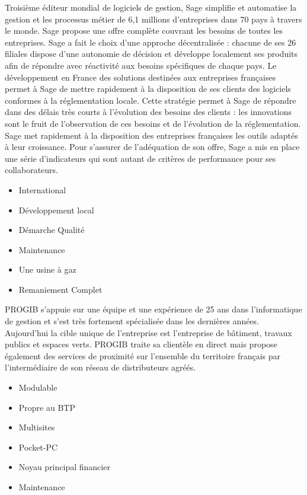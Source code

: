{
	Troisième éditeur mondial de logiciels de gestion, Sage simplifie et automatise la gestion et les processus métier de 6,1 millions d'entreprises dans 70 pays à travers le monde.
	Sage propose une offre complète couvrant les besoins de toutes les entreprises.
	Sage a fait le choix d'une approche décentralisée : chacune de ses 26 filiales dispose d'une autonomie
	de décision et développe localement ses produits afin de répondre avec réactivité aux besoins spécifiques de chaque pays.
	Le développement en France des solutions destinées aux entreprises françaises permet  à  Sage de mettre rapidement à la disposition de ses clients des logiciels conformes à la réglementation locale.
	Cette stratégie permet à Sage de répondre dans des délais très courts  à  l'évolution des besoins des clients : les innovations sont le fruit de l'observation de ces besoins et de l'évolution de la réglementation.
	Sage met rapidement à la disposition des entreprises françaises les outils adaptés à leur croissance.
	Pour s'assurer de l'adéquation de son offre, Sage a mis en place une série d'indicateurs qui sont autant de critères de performance pour ses collaborateurs.
}
{
    \begin{itemize}
        \item International
        \item Développement local
        \item Démarche Qualité
        \item Maintenance
    \end{itemize}
}
{
    \begin{itemize}
        \item Une usine à gaz%
        \item Remaniement Complet
    \end{itemize}
}
 
{
    PROGIB s'appuie sur une équipe et une expérience de 25 ans dans l'informatique de gestion et s'est très fortement spécialisée dans les dernières années.
    Aujourd'hui la cible unique de l'entreprise est l'entreprise de bâtiment, travaux publics et espaces verts.
    PROGIB traite sa clientèle en direct mais propose également des services de proximité sur l'ensemble du territoire
    français par l'intermédiaire de son réseau de distributeurs agréés.
}
{
    \begin{itemize}
        \item Modulable
        \item Propre au BTP
        \item Multisites
        \item Pocket-PC
    \end{itemize}
}
{
    \begin{itemize}
        \item Noyau principal financier
        \item Maintenance%
    \end{itemize}
}
